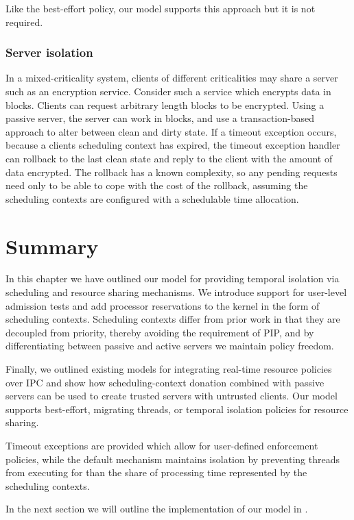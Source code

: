Like the best-effort policy, our model supports this approach but it is not required.

\subsubsection{Server isolation}

In a mixed-criticality system, clients of different criticalities may share a server such as an
encryption service. Consider such a service which encrypts data in blocks. Clients can request
arbitrary length blocks to be encrypted. Using a passive server, the server can work in blocks, and
use a transaction-based approach to alter between clean and dirty state. If a timeout exception
occurs, because a clients scheduling context has expired, the timeout exception handler can rollback
to the last clean state and reply to the client with the amount of data encrypted. The rollback has
a known complexity, so any pending requests need only to be able to cope with the cost of the
rollback, assuming the scheduling contexts are configured with a schedulable time allocation.


\section{Summary}

In this chapter we have outlined our model for providing temporal isolation via scheduling and
resource sharing mechanisms. We introduce support for user-level
admission tests and add processor reservations to the kernel in the form of scheduling contexts.  
Scheduling contexts differ from prior work in that they are decoupled from priority, thereby
avoiding the requirement of \gls{PIP}, and by differentiating between passive and active servers we
maintain policy freedom.

Finally, we outlined existing models for integrating real-time resource policies over \gls{IPC} and
show how scheduling-context donation combined with passive servers can be used to create trusted
servers with untrusted clients. 
Our model supports best-effort, migrating threads, or temporal isolation policies for resource sharing.

Timeout exceptions are provided which allow for user-defined enforcement policies, while the default
mechanism maintains isolation by preventing threads from executing for than the share of processing
time represented by the scheduling contexts.

In the next section we will outline the implementation of our model in \selfour. 

